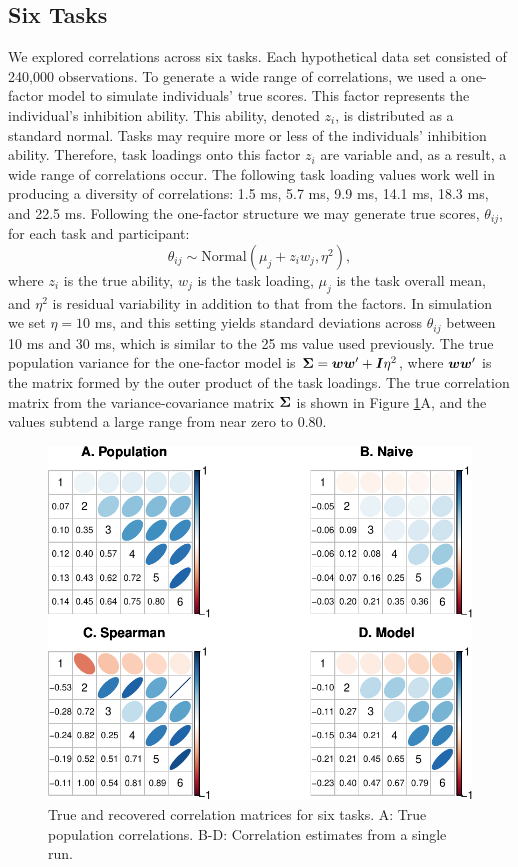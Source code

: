 \documentclass[
  english,
  ,man]{apa6}
\begin{document}
\hypertarget{six-tasks}{%
\subsection{Six Tasks}\label{six-tasks}}

We explored correlations across six tasks. Each hypothetical data set consisted of 240,000 observations. To generate a wide range of correlations, we used a one-factor model to simulate individuals' true scores. This factor represents the individual's inhibition ability. This ability, denoted \(z_i\), is distributed as a standard normal. Tasks may require more or less of the individuals' inhibition ability. Therefore, task loadings onto this factor \(z_i\) are variable and, as a result, a wide range of correlations occur. The following task loading values work well in producing a diversity of correlations: 1.5 ms, 5.7 ms, 9.9 ms, 14.1 ms, 18.3 ms, and 22.5 ms. Following the one-factor structure we may generate true scores, \(\theta_{ij}\), for each task and participant:
\[
\theta_{ij} \sim \mbox{Normal}(\mu_j+z_iw_j,\eta^2),
\]
where \(z_i\) is the true ability, \(w_j\) is the task loading, \(\mu_j\) is the task overall mean, and \(\eta^2\) is residual variability in addition to that from the factors. In simulation we set \(\eta=10\) ms, and this setting yields standard deviations across \(\theta_{ij}\) between 10 ms and 30 ms, which is similar to the 25 ms value used previously. The true population variance for the one-factor model is \(\bm \Sigma = \bm w\bm w' + \bm I\eta^2\), where \(\bm w\bm w'\) is the matrix formed by the outer product of the task loadings. The true correlation matrix from the variance-covariance matrix \(\bm \Sigma\) is shown in Figure \ref{fig:cov6}A, and the values subtend a large range from near zero to 0.80.

\begin{figure}
\centering
\includegraphics{p_files/figure-latex/cov6-1.pdf}
\caption{\label{fig:cov6}True and recovered correlation matrices for six tasks. A: True population correlations. B-D: Correlation estimates from a single run.}
\end{figure}
\end{document}
